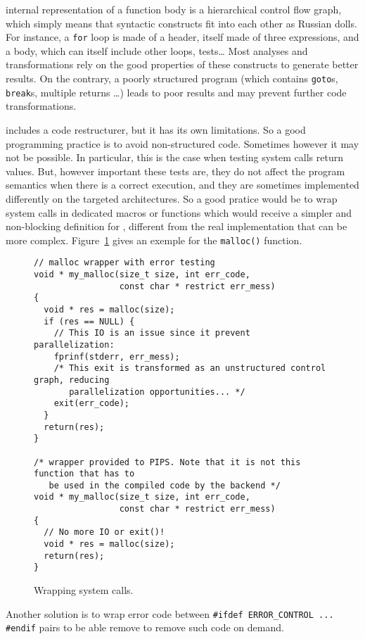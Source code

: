 \documentclass[a4paper]{article}
\begin{document}
\Apips internal representation of a function body is a hierarchical
control flow graph, which simply means that syntactic constructs fit
into each other as Russian dolls. For instance, a \texttt{for} loop is
made of a header, itself made of three expressions, and a body, which
can itself include other loops, tests\ldots{} Most analyses and
transformations rely on the good properties of these constructs to
generate better results. On the contrary, a poorly structured program
(which contains \texttt{goto}s, \texttt{break}s, multiple {return}s
\ldots) leads to poor results and may prevent further code
transformations.

\Apips includes a code restructurer, but it has its own limitations. So a
good programming practice is to avoid non-structured code. Sometimes
however it may not be possible. In particular, this is the case when
testing system calls return values. But, however important these tests
are, they do not affect the program semantics when there is a correct
execution, and they are sometimes implemented differently on the targeted
architectures. So a good pratice would be to wrap system calls in
dedicated macros or functions which would receive a simpler and
non-blocking definition for \Apips, different from the real implementation
that can be more complex. Figure~\ref{fig:wrapping_system_calls} gives an
exemple for the \texttt{malloc()} function.

\begin{figure}
\begin{lstlisting}
// malloc wrapper with error testing
void * my_malloc(size_t size, int err_code,
                 const char * restrict err_mess)
{
  void * res = malloc(size);
  if (res == NULL) {
    // This IO is an issue since it prevent parallelization:
    fprinf(stderr, err_mess);
    /* This exit is transformed as an unstructured control graph, reducing
       parallelization opportunities... */
    exit(err_code);
  }
  return(res);
}

/* wrapper provided to PIPS. Note that it is not this function that has to
   be used in the compiled code by the backend */
void * my_malloc(size_t size, int err_code,
                 const char * restrict err_mess)
{
  // No more IO or exit()!
  void * res = malloc(size);
  return(res);
}
\end{lstlisting}

  \caption{Wrapping system calls.}
  \label{fig:wrapping_system_calls}
\end{figure}

Another solution is to wrap error code between %
\lstinline|#ifdef ERROR_CONTROL ... #endif| pairs to be able remove to
remove such code on demand.
\end{document}
